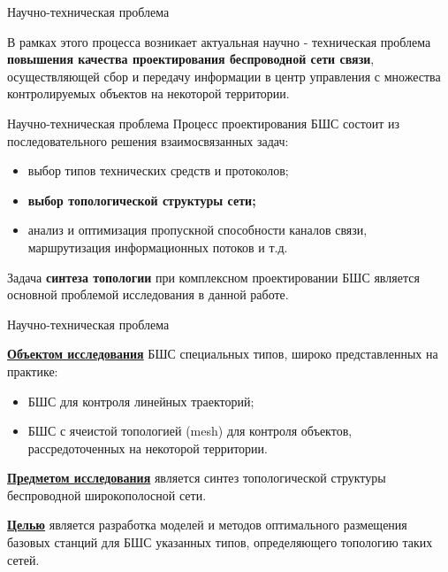 
\begin{frame}
    {Научно-техническая проблема}
    \justifying

    В рамках этого процесса возникает актуальная научно - техническая проблема \textbf{повышения качества проектирования беспроводной сети связи}, осуществляющей сбор и передачу информации в центр  управления с множества контролируемых объектов на некоторой территории. 

\end{frame}


\begin{frame}
    {Научно-техническая проблема}
    Процесс проектирования БШС состоит из последовательного решения взаимосвязанных задач:
    
    \bigskip

    \begin{itemize}
        \item выбор типов технических средств и протоколов;
        \item \textbf{выбор топологической структуры сети;}
        \item анализ и оптимизация пропускной способности каналов связи, маршрутизация информационных потоков и т.д.
    \end{itemize}

    \bigskip
    
    Задача \textbf{синтеза топологии} при комплексном проектировании БШС является основной проблемой исследования в данной работе.

\end{frame}

\begin{frame}
    {Научно-техническая проблема}

    \textbf{\underline{Объектом исследования}} БШС специальных типов, широко представленных на практике:
    
    \bigskip

    \begin{itemize}
        \item БШС для контроля линейных траекторий;
        \item БШС с ячеистой топологией (mesh) для контроля объектов, рассредоточенных на некоторой территории.
    \end{itemize}

    \bigskip

    \textbf{\underline{Предметом исследования}} является синтез топологической структуры беспроводной широкополосной сети.

    \bigskip
    
    \textbf{\underline{Целью}} является разработка моделей и методов оптимального размещения базовых станций для БШС указанных типов, определяющего топологию таких сетей.
\end{frame}

